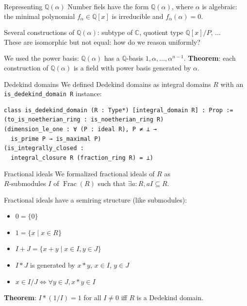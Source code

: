 \documentclass{beamer}
\newcommand{\C}{\mathbb{C}}
\newcommand{\lean}[1]{\texttt{#1}\xspace}
\newcommand{\Q}{\mathbb{Q}}
\newcommand{\Z}{\mathbb{Z}}
\DeclareMathOperator{\Frac}{Frac}
\begin{document}
%
%

\begin{frame}{Representing $\Q(\alpha)$}
	Number fiels have the form $\Q(\alpha)$, where $\alpha$ is algebraic:\\
	the minimal polynomial $f_\alpha \in \Q[x]$ is irreducible and $f_\alpha(\alpha) = 0$.

	Several constructions of $\Q(\alpha)$: subtype of $\C$, quotient type $\Q[x] / P$, ...\\
	These are isomorphic but not equal: how do we reason uniformly?

\pause
	We used the \alert{power basis}: $\Q(\alpha)$ has a $\Q$-basis $1, \alpha, \dots, \alpha^{n - 1}$.
	\textbf{Theorem}: each construction of $\Q(\alpha)$ is a field with power basis generated by $\alpha$.
\end{frame}

\begin{frame}[fragile]{Dedekind domains}
	We defined Dedekind domains as integral domains $R$ with an \lean{is\_dedekind\_domain R} instance:
\begin{lstlisting}
class is_dedekind_domain (R : Type*) [integral_domain R] : Prop :=
(to_is_noetherian_ring : is_noetherian_ring R)
(dimension_le_one : ∀ (P : ideal R), P ≠ ⊥ →
  is_prime P → is_maximal P)
(is_integrally_closed :
  integral_closure R (fraction_ring R) = ⊥)
\end{lstlisting}

\end{frame}

\begin{frame}{Fractional ideals}
	We formalized fractional ideals of $R$ as\\
	$R$-submodules $I$ of $\Frac(R)$ such that $\exists a : R, a I \subseteq R$.

	Fractional ideals have a semiring structure (like submodules):\\
	\begin{itemize}
		\item $0 = \{0\}$
		\item $1 = \{x \mid x \in R\}$
		\item $I + J = \{x + y \mid x \in I, y \in J\}$
		\item $I * J$ is generated by $x * y$, $x \in I$, $y \in J$
		\item $x \in I / J \iff \forall y \in J, x * y \in I$
	\end{itemize}

\pause
	\textbf{Theorem}: $I * (1 / I) = 1$ for all $I \ne 0$ iff $R$ is a Dedekind domain.
\end{frame}
\end{document}
